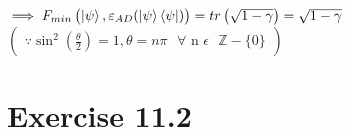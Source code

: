 \documentclass[a4paper,12pt]{article}
\begin{document}
\begin{enumerate}[label=(\alph*)]
$\implies F_{min}\begin{pmatrix}
    \ket{\psi}, \varepsilon_{AD}(\ket\psi\bra{\psi})
\end{pmatrix} = tr\begin{pmatrix}
    \sqrt{1-\gamma}
\end{pmatrix} = \sqrt{1-\gamma}$ \hspace{10mm}$\begin{pmatrix}
    \because \sin^{2}(\frac{\theta}{2})=1, \theta= n\pi \text{ $\forall$ n $\epsilon$ $\mathbb{Z}-\{0\}$}
\end{pmatrix}$ \pagebreak
\end{enumerate}

\section*{Exercise 11.2}
\end{document}
